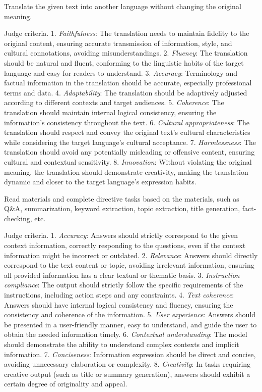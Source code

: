 
 Translate the given text into another language without changing the original meaning.

Judge criteria.   
1. \emph{Faithfulness}: The translation needs to maintain fidelity to the original content, ensuring accurate transmission of information, style, and cultural connotations, avoiding misunderstandings.
2. \emph{Fluency}: The translation should be natural and fluent, conforming to the linguistic habits of the target language and easy for readers to understand.
3. \emph{Accuracy}: Terminology and factual information in the translation should be accurate, especially professional terms and data.
4. \emph{Adaptability}: The translation should be adaptively adjusted according to different contexts and target audiences.
5. \emph{Coherence}: The translation should maintain internal logical consistency, ensuring the information's consistency throughout the text.
6. \emph{Cultural appropriateness}: The translation should respect and convey the original text's cultural characteristics while considering the target language's cultural acceptance.
7. \emph{Harmlessness}: The translation should avoid any potentially misleading or offensive content, ensuring cultural and contextual sensitivity.
8. \emph{Innovation}: Without violating the original meaning, the translation should demonstrate creativity, making the translation dynamic and closer to the target language's expression habits.


 Read materials and complete directive tasks based on the materials, such as Q\&A, summarization, keyword extraction, topic extraction, title generation, fact-checking, etc.

Judge criteria.   
1. \emph{Accuracy}: Answers should strictly correspond to the given context information, correctly responding to the questions, even if the context information might be incorrect or outdated.
2. \emph{Relevance}: Answers should directly correspond to the text content or topic, avoiding irrelevant information, ensuring all provided information has a clear textual or thematic basis.
3. \emph{Instruction compliance}: The output should strictly follow the specific requirements of the instructions, including action steps and any constraints.
4. \emph{Text coherence}: Answers should have internal logical consistency and fluency, ensuring the consistency and coherence of the information.
5. \emph{User experience}: Answers should be presented in a user-friendly manner, easy to understand, and guide the user to obtain the needed information timely.
6. \emph{Contextual understanding}: The model should demonstrate the ability to understand complex contexts and implicit information.
7. \emph{Conciseness}: Information expression should be direct and concise, avoiding unnecessary elaboration or complexity.
8. \emph{Creativity}: In tasks requiring creative output (such as title or summary generation), answers should exhibit a certain degree of originality and appeal.

